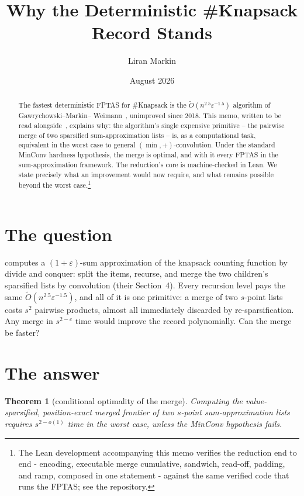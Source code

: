 \documentclass[11pt]{article}
\title{Why the Deterministic \#Knapsack Record Stands}
\author{Liran Markin}
\date{August 2026}
\newcommand{\OO}{\widetilde{O}}
\newtheorem{theorem}{Theorem}
\begin{document}
\maketitle

\begin{abstract}
\noindent
The fastest deterministic FPTAS for \#Knapsack is the
$\OO(n^{2.5}\varepsilon^{-1.5})$ algorithm of Gawrychowski--Markin--%
Weimann~\cite{GMW18}, unimproved since 2018. This memo, written to be
read alongside~\cite{GMW18}, explains why: the algorithm's single
expensive primitive -- the pairwise merge of two sparsified
sum-approximation lists -- is, as a computational task, equivalent in
the worst case to general $(\min,+)$-convolution. Under the standard
MinConv hardness hypothesis, the merge is optimal, and with it every
FPTAS in the sum-approximation framework. The reduction's core is
machine-checked in Lean. We state precisely what an improvement would
now require, and what remains possible beyond the worst
case.\footnote{The Lean development accompanying this memo verifies
the reduction end to end - encoding, executable merge cumulative,
sandwich, read-off, padding, and ramp, composed in one statement -
against the same verified code that runs the FPTAS; see the
repository.}
\end{abstract}

\section{The question}

\cite{GMW18} computes a $(1+\varepsilon)$-sum approximation of the
knapsack counting function by divide and conquer: split the items,
recurse, and merge the two children's sparsified lists by convolution
(their Section~4). Every recursion level pays the same
$\OO(n^{2.5}\varepsilon^{-1.5})$, and all of it is one primitive: a
merge of two $s$-point lists costs $s^2$ pairwise products, almost all
immediately discarded by re-sparsification. Any merge in $s^{2-c}$
time would improve the record polynomially. Can the merge be faster?

\section{The answer}

\begin{theorem}[conditional optimality of the merge]
Computing the value-sparsified, position-exact merged frontier of two
$s$-point sum-approximation lists requires $s^{2-o(1)}$ time in the
worst case, unless the MinConv hypothesis fails.
\end{theorem}
\end{document}
